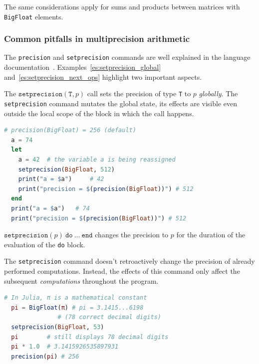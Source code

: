 The same considerations apply for sums and products between matrices with \texttt{BigFloat} elements.


\subsubsection*{Common pitfalls in multiprecision arithmetic}
The \texttt{precision} and \texttt{setprecision} commands are well explained in the language documentation~\cite{link:julia_documentation}.
Examples~\ref{es:setprecision_global} and~\ref{es:setprecision_next_ops} highlight two important aspects.

\begin{esempio}\label{es:setprecision_global}
	The $\mathtt{setprecision}(\mathtt{T}, p)$ call sets the precision of type \texttt{T} to $p$ \emph{globally}. The \texttt{setprecision} command mutates the global state, its effects are visible even outside the local scope of the block in which the call happens.
\begin{lstlisting}[language=Julia]
  # precision(BigFloat) = 256 (default)
  a = 74	
  let 
    a = 42	# the variable a is being reassigned
    setprecision(BigFloat, 512)
    print("a = $a") 	# 42
    print("precision = $(precision(BigFloat))") # 512
  end 
  print("a = $a") 	# 74
  print("precision = $(precision(BigFloat))") # 512
\end{lstlisting}
	$\mathtt{setprecision}(p)\ \mathtt{do}\ \dots\ \mathtt{end}$ changes the precision to $p$ for the duration of the evaluation of the \texttt{do} block.
\end{esempio}

\begin{esempio}\label{es:setprecision_next_ops}
	The \texttt{setprecision} command doesn't retroactively change the precision of already performed computations. Instead, the effects of this command only affect the subsequent \emph{computations} throughout the program.
\begin{lstlisting}[language=Julia]
  # In Julia, π is a mathematical constant
  pi = BigFloat(π) # pi = 3.1415...6198 
        	   # (78 correct decimal digits)
  setprecision(BigFloat, 53)
  pi 		# still displays 78 decimal digits 
  pi * 1.0	# 3.1415926535897931
  precision(pi)	# 256
\end{lstlisting}
\end{esempio}
\smallskip 

